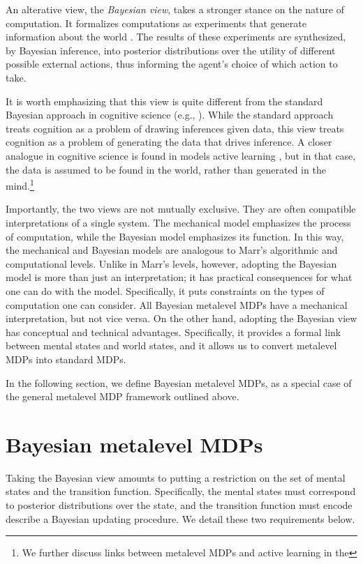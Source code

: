 An alterative view, the \emph{Bayesian view}, takes a stronger stance on the nature of computation. It formalizes computations as experiments that generate information about the world \citep{matheson1968economic}. The results of these experiments are synthesized, by Bayesian inference, into posterior distributions over the utility of different possible external actions, thus informing the agent's choice of which action to take. 

It is worth emphasizing that this view is quite different from the standard Bayesian approach in cognitive science (e.g., \citealp{tenenbaum2011how}). While the standard approach treats cognition as a problem of drawing inferences given data, this view treats cognition as a problem of generating the data that drives inference. A closer analogue in cognitive science is found in models active learning \citep{gureckis2012selfdirected,gottlieb2013informationseeking}, but in that case, the data is assumed to be found in the world, rather than generated in the mind.\footnote{We further discuss links between metalevel MDPs and active learning in the }

Importantly, the two views are not mutually exclusive. They are often compatible interpretations of a single system. The mechanical model emphasizes the process of computation, while the Bayesian model emphasizes its function. In this way, the mechanical and Bayesian models are analogous to Marr's algorithmic and computational levels. Unlike in Marr's levels, however, adopting the Bayesian model is more than just an interpretation; it has practical consequences for what one can do with the model. Specifically, it puts constraints on the types of computation one can consider. All Bayesian metalevel MDPs have a mechanical interpretation, but not vice versa. On the other hand, adopting the Bayesian view has conceptual and technical advantages. Specifically, it provides a formal link between mental states and world states, and it allows us to convert metalevel MDPs into standard MDPs.

In the following section, we define Bayesian metalevel MDPs, as a special case of the general metalevel MDP framework outlined above.

\section{Bayesian metalevel MDPs}

Taking the Bayesian view amounts to putting a restriction on the set of mental states and the transition function. Specifically, the mental states must correspond to posterior distributions over the state, and the transition function must encode describe a Bayesian updating procedure. We detail these two requirements below.


